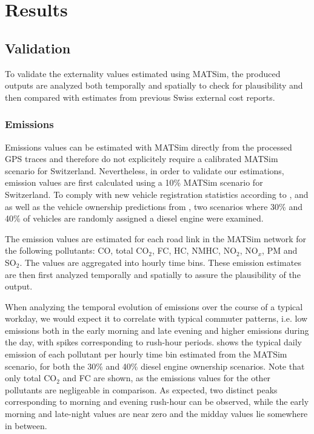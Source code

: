 \section{Results}
\subsection{Validation}
To validate the externality values estimated using MATSim, the produced outputs are analyzed both temporally and spatially to check for plausibility and then compared with estimates from previous Swiss external cost reports.

\subsubsection{Emissions}
Emissions values can be estimated with MATSim directly from the processed GPS traces and therefore do not explicitely require a calibrated MATSim scenario for Switzerland.
Nevertheless, in order to validate our estimations, emission values are first calculated using a 10\% MATSim scenario for Switzerland.
To comply with new vehicle registration statistics according to \citet{autoschweiz2010}, \citet{autoschweiz2012} and \citet{energieVerbrauchEffizienzPersonenwagen2015} as well as the vehicle ownership predictions from \citet{foen2010pollutants}, two scenarios where 30\% and 40\% of vehicles are randomly assigned a diesel engine were examined.

The emission values are estimated for each road link in the MATSim network for the following pollutants: CO, total CO$_2$, FC, HC, NMHC, NO$_2$, NO$_x$, PM and SO$_2$.
The values are aggregated into hourly time bins.
These emission estimates are then first analyzed temporally and spatially to assure the plausibility of the output.

When analyzing the temporal evolution of emissions over the course of a typical workday, we would expect it to correlate with typical commuter patterns, i.e. low emissions both in the early morning and late evening and higher emissions during the day, with spikes corresponding to rush-hour periods.
 shows the typical daily emission of each pollutant per hourly time bin estimated from the MATSim scenario, for both the 30\% and 40\% diesel engine ownership scenarios.
Note that only total CO$_2$ and FC are shown, as the emissions values for the other pollutants are negligeable in comparison.
As expected, two distinct peaks corresponding to morning and evening rush-hour can be observed, while the early morning and late-night values are near zero and the midday values lie somewhere in between.

